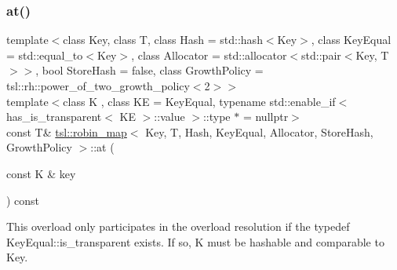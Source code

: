 \subsubsection{\texorpdfstring{at()}{at()}\hspace{0.1cm}{\footnotesize\ttfamily [5/6]}}
{\footnotesize\ttfamily template$<$class Key, class T, class Hash = std\+::hash$<$\+Key$>$, class Key\+Equal = std\+::equal\+\_\+to$<$\+Key$>$, class Allocator = std\+::allocator$<$std\+::pair$<$\+Key, T$>$$>$, bool Store\+Hash = false, class Growth\+Policy = tsl\+::rh\+::power\+\_\+of\+\_\+two\+\_\+growth\+\_\+policy$<$2$>$$>$ \\
template$<$class K , class KE  = Key\+Equal, typename std\+::enable\+\_\+if$<$ has\+\_\+is\+\_\+transparent$<$ K\+E $>$\+::value $>$\+::type $\ast$  = nullptr$>$ \\
const T\& \mbox{\hyperlink{classtsl_1_1robin__map}{tsl\+::robin\+\_\+map}}$<$ Key, T, Hash, Key\+Equal, Allocator, Store\+Hash, Growth\+Policy $>$\+::at (\begin{DoxyParamCaption}\item[{const K \&}]{key }\end{DoxyParamCaption}) const\hspace{0.3cm}{\ttfamily [inline]}}





This overload only participates in the overload resolution if the typedef Key\+Equal\+::is\+\_\+transparent exists. If so, K must be hashable and comparable to Key. \mbox{\label{classtsl_1_1robin__map_a7e91f5663f1ee79235803ecfed3057f2}} 
